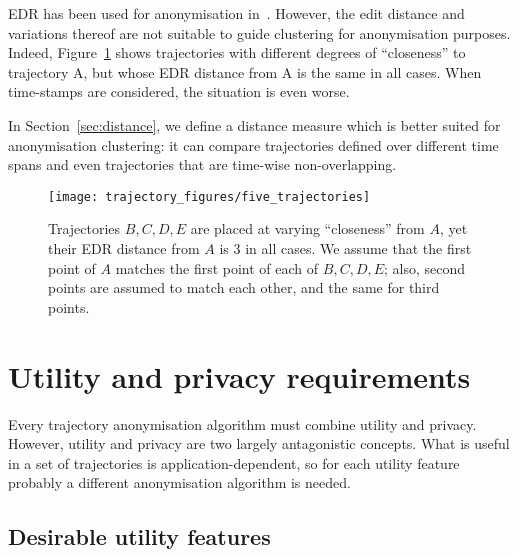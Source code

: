 EDR has been used for anonymisation in~\cite{abul10}. However, the
edit distance and variations thereof
are not suitable to guide clustering
for anonymisation purposes. Indeed,
Figure~\ref{fig:edrdistances} shows trajectories with
different degrees of ``closeness'' to trajectory A,
but whose EDR distance from A is the same in all cases.
When time-stamps are considered, the situation is even worse.

In Section~\ref{sec:distance}, we define a
distance measure which is better suited for anonymisation
clustering: it can compare trajectories
defined over different time spans and
even trajectories that are time-wise non-overlapping.


\begin{figure}[!ht]
\centering



\texttt{[image: trajectory\_figures/five\_trajectories]}

\caption{Trajectories $B, C, D, E$ are placed at varying
``closeness'' from $A$, yet their EDR distance from $A$
is 3 in all cases. We assume that the first point of $A$
matches the first point of each of $B,C,D,E$; also,
second points are assumed to match each other, and the
same for third points.}
\label{fig:edrdistances}
\end{figure}

\section{Utility and privacy requirements} \label{sec:utilpriv}

Every trajectory anonymisation algorithm must combine utility and privacy.
However, utility and privacy are two largely antagonistic concepts. What is
useful in a set of trajectories is application-dependent, so for each
utility feature probably a different anonymisation algorithm is needed.

\subsection{Desirable utility features}

